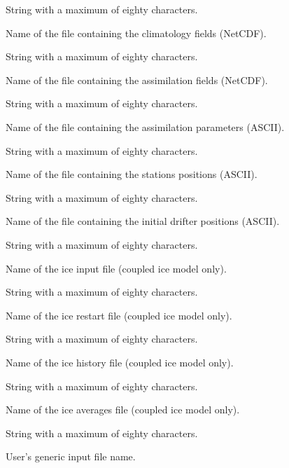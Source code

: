 \begin{klist}
\begin{klist}
     \end{klist}
     String with a maximum of eighty characters.
     \begin{klist}
         Name of the file containing the climatology
     fields (NetCDF).
     \end{klist}
     String with a maximum of eighty characters.
     \begin{klist}
         Name of the file containing the assimilation
     fields (NetCDF).
     \end{klist}
     String with a maximum of eighty characters.
     \begin{klist}
         Name of the file containing the assimilation
     parameters (ASCII).
     \end{klist}
     String with a maximum of eighty characters.
     \begin{klist}
         Name of the file containing the stations
     positions (ASCII).
     \end{klist}
     String with a maximum of eighty characters.
     \begin{klist}
         Name of the file containing the initial drifter
     positions (ASCII).
     \end{klist}
     String with a maximum of eighty characters.
     \begin{klist}
         Name of the ice input file (coupled ice model
       only).
     \end{klist}
     String with a maximum of eighty characters.
     \begin{klist}
         Name of the ice restart file (coupled ice model
       only).
     \end{klist}
     String with a maximum of eighty characters.
     \begin{klist}
          Name of the ice history file (coupled ice
       model only).
     \end{klist}
     String with a maximum of eighty characters.
     \begin{klist}
          Name of the ice averages file (coupled ice
       model only).
     \end{klist}
     String with a maximum of eighty characters.
     \begin{klist}
         User's generic input file name.
     \end{klist}
\end{klist}

